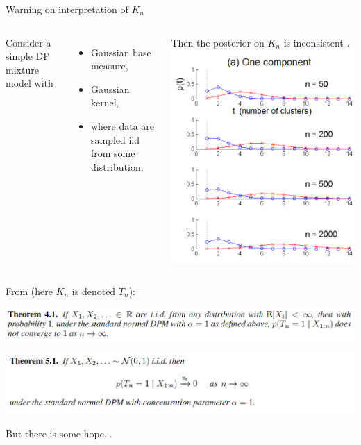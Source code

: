\begin{frame}[allowframebreaks]{Warning on interpretation of $K_n$}
\begin{columns}


	Consider a simple DP mixture model with
	\begin{itemize}
		\item  Gaussian base measure, 
		\item Gaussian kernel,
		\item where data are sampled  iid from some distribution.
	\end{itemize}
	
Then the \alert{posterior on $K_n$ is inconsistent} \citep{miller2013simple}.
\includegraphics[width=\textwidth]{figures_julyan/mixtures/miller_DP}
\end{columns}
\framebreak

From \citet{miller2013simple} (here $K_n$ is denoted $T_n$):\bigskip

\includegraphics[width=\textwidth]{figures_julyan/mixtures/miller_inconsistency1}\bigskip

\includegraphics[width=\textwidth]{figures_julyan/mixtures/miller_inconsistency2}\bigskip


But there is some hope...
\end{frame}



